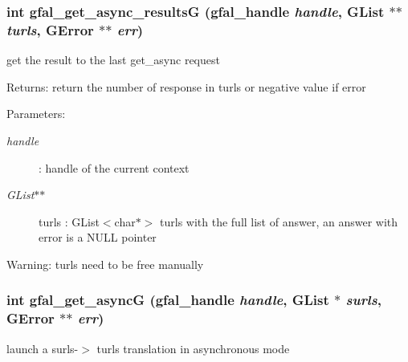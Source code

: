 \subsubsection{\setlength{\rightskip}{0pt plus 5cm}int gfal\_\-get\_\-async\_\-results\-G (gfal\_\-handle {\em handle}, GList $\ast$$\ast$ {\em turls}, GError $\ast$$\ast$ {\em err})}\label{gfal__common__srm_8h_1c3a2a23f764ce8bf5cdd73108e4d9ca}


get the result to the last get\_\-async request 

\begin{Desc}
\item[Returns:]return the number of response in turls or negative value if error \end{Desc}
\begin{Desc}
\item[Parameters:]
\begin{description}
\item[{\em handle}]: handle of the current context \item[{\em GList$\ast$$\ast$}]turls : GList$<$char$\ast$$>$ turls with the full list of answer, an answer with error is a NULL pointer \end{description}
\end{Desc}
\begin{Desc}
\item[Warning:]turls need to be free manually \end{Desc}
\subsubsection{\setlength{\rightskip}{0pt plus 5cm}int gfal\_\-get\_\-async\-G (gfal\_\-handle {\em handle}, GList $\ast$ {\em surls}, GError $\ast$$\ast$ {\em err})}\label{gfal__common__srm_8h_95ffd4de24c18af334c1d9c270de7d81}


launch a surls-$>$ turls translation in asynchronous mode 

